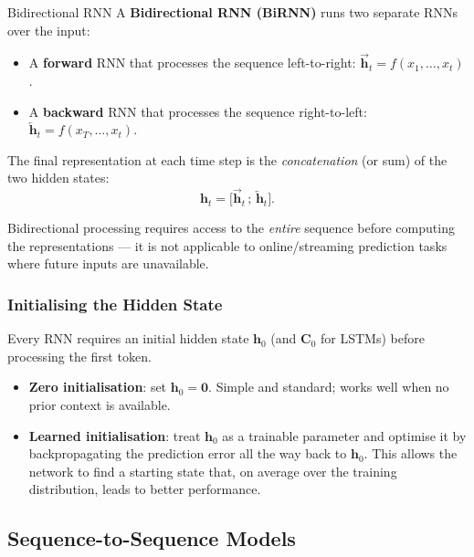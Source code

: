 \documentclass[11pt,a4paper]{article}
\newcommand{\term}[1]{\textcolor{DefGreen}{\textbf{#1}}}
\begin{document}
\begin{defbox}{Bidirectional RNN}
A \term{Bidirectional RNN (BiRNN)} runs two separate RNNs over the input:
\begin{itemize}
  \item A \textbf{forward} RNN that processes the sequence left-to-right: $\overrightarrow{\mathbf{h}}_t = f(x_1,\ldots,x_t)$.
  \item A \textbf{backward} RNN that processes the sequence right-to-left: $\overleftarrow{\mathbf{h}}_t = f(x_T,\ldots,x_t)$.
\end{itemize}
The final representation at each time step is the \emph{concatenation} (or sum) of the two hidden states:
\[
  \mathbf{h}_t = \bigl[\overrightarrow{\mathbf{h}}_t\,;\,\overleftarrow{\mathbf{h}}_t\bigr].
\]
\end{defbox}

\begin{notebox}
Bidirectional processing requires access to the \emph{entire} sequence before computing the representations — it is not applicable to online/streaming prediction tasks where future inputs are unavailable.
\end{notebox}

\subsubsection{Initialising the Hidden State}

Every RNN requires an initial hidden state $\mathbf{h}_0$ (and $\mathbf{C}_0$ for LSTMs) before processing the first token.

\begin{itemize}
  \item \textbf{Zero initialisation}: set $\mathbf{h}_0 = \mathbf{0}$. Simple and standard; works well when no prior context is available.
  \item \textbf{Learned initialisation}: treat $\mathbf{h}_0$ as a trainable parameter and optimise it by backpropagating the prediction error all the way back to $\mathbf{h}_0$. This allows the network to find a starting state that, on average over the training distribution, leads to better performance.
\end{itemize}

\subsection{Sequence-to-Sequence Models}
\label{sec:seq2seq}
\end{document}
